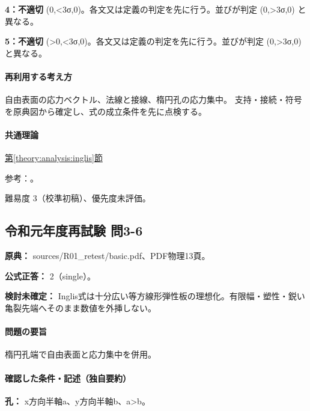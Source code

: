 \noindent\textbf{4：不適切} (0,<3σ,0)。各文又は定義の判定を先に行う。並びが判定 (0,>3σ,0) と異なる。\par

\noindent\textbf{5：不適切} (>0,<3σ,0)。各文又は定義の判定を先に行う。並びが判定 (0,>3σ,0) と異なる。\par

\paragraph{再利用する考え方} 自由表面の応力ベクトル、法線と接線、楕円孔の応力集中。 支持・接続・符号を原典図から確定し、式の成立条件を先に点検する。

\paragraph{共通理論} \hyperref[theory:analysis:inglis]{第\ref*{theory:analysis:inglis}節}

\par 参考：\cite{analysis57_inglis}。

\par 難易度 3（校準初稿）、優先度未評価。

\subsection{令和元年度再試験 問3-6}
\label{q:r01-ret-basic-3-6}

\noindent\textbf{原典：} sources/R01\_retest/basic.pdf、PDF物理13頁。

\textbf{公式正答：} 2（single）。

\par\textbf{検討未確定：} Inglis式は十分広い等方線形弾性板の理想化。有限幅・塑性・鋭い亀裂先端へそのまま数値を外挿しない。

\paragraph{問題の要旨} 楕円孔端で自由表面と応力集中を併用。

\paragraph{確認した条件・記述（独自要約）}\mbox{}\par

\noindent\textbf{孔：} x方向半軸a、y方向半軸b、a>b。\par

